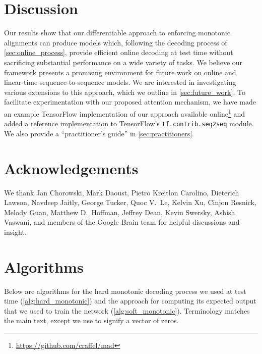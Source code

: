 \documentclass{article}
\begin{document}
\section{Discussion}

Our results show that our differentiable approach to enforcing monotonic alignments can produce models which, following the decoding process of \cref{sec:online_process}, provide efficient online decoding at test time without sacrificing substantial performance on a wide variety of tasks.
We believe our framework presents a promising environment for future work on online and linear-time sequence-to-sequence models.
We are interested in investigating various extensions to this approach, which we outline in \cref{sec:future_work}.
To facilitate experimentation with our proposed attention mechanism, we have made an example TensorFlow  implementation of our approach available online\footnote{\url{https://github.com/craffel/mad}} and added a reference implementation to TensorFlow's \texttt{tf.contrib.seq2seq} module.
We also provide a ``practitioner's guide'' in \cref{sec:practitioners}.

\section*{Acknowledgements}

We thank Jan Chorowski, Mark Daoust, Pietro Kreitlon Carolino, Dieterich Lawson, Navdeep Jaitly, George Tucker, Quoc V.\ Le, Kelvin Xu, Cinjon Resnick, Melody Guan, Matthew D.\ Hoffman, Jeffrey Dean, Kevin Swersky, Ashish Vaswani, and members of the Google Brain team for helpful discussions and insight.


\clearpage

\appendix

\onecolumn

\section{Algorithms}
\label{sec:algorithms}

Below are algorithms for the hard monotonic decoding process we used at test time (\cref{alg:hard_monotonic}) and the approach for computing its expected output that we used to train the network (\cref{alg:soft_monotonic}).
Terminology matches the main text, except we use  to signify a vector of zeros.
\end{document}
